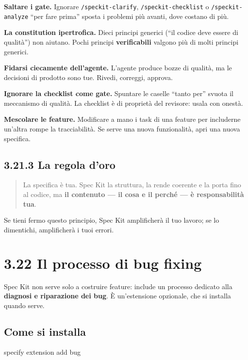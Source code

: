 \documentclass[
  italian,
  10pt,
]{book}
\newenvironment{Shaded}{\begin{snugshade}}{\end{snugshade}}
\newcommand{\ExtensionTok}[1]{#1}
\newcommand{\NormalTok}[1]{#1}
\begin{document}
\textbf{Saltare i gate.} Ignorare \texttt{/speckit-clarify},
\texttt{/speckit-checklist} o \texttt{/speckit-analyze} ``per fare
prima'' sposta i problemi più avanti, dove costano di più.

\textbf{La constitution ipertrofica.} Dieci principi generici (``il
codice deve essere di qualità'') non aiutano. Pochi principi
\textbf{verificabili} valgono più di molti principi generici.

\textbf{Fidarsi ciecamente dell'agente.} L'agente produce bozze di
qualità, ma le decisioni di prodotto sono tue. Rivedi, correggi,
approva.

\textbf{Ignorare la checklist come gate.} Spuntare le caselle ``tanto
per'' svuota il meccanismo di qualità. La checklist è di proprietà del
revisore: usala con onestà.

\textbf{Mescolare le feature.} Modificare a mano i task di una feature
per includerne un'altra rompe la tracciabilità. Se serve una nuova
funzionalità, apri una nuova specifica.

\subsection{3.21.3 La regola d'oro}\label{la-regola-doro}

\begin{quote}
La specifica è tua. Spec Kit la struttura, la rende coerente e la porta
fino al codice, ma \textbf{il contenuto --- il cosa e il perché --- è
responsabilità tua}.
\end{quote}

Se tieni fermo questo principio, Spec Kit amplificherà il tuo lavoro; se
lo dimentichi, amplificherà i tuoi errori.

\section{3.22 Il processo di bug
fixing}\label{il-processo-di-bug-fixing}

Spec Kit non serve solo a costruire feature: include un processo
dedicato alla \textbf{diagnosi e riparazione dei bug}. È un'estensione
opzionale, che si installa quando serve.

\subsection{Come si installa}\label{come-si-installa}

\begin{Shaded}
\begin{Highlighting}[]
\ExtensionTok{specify}\NormalTok{ extension add bug}
\end{Highlighting}
\end{Shaded}
\end{document}
